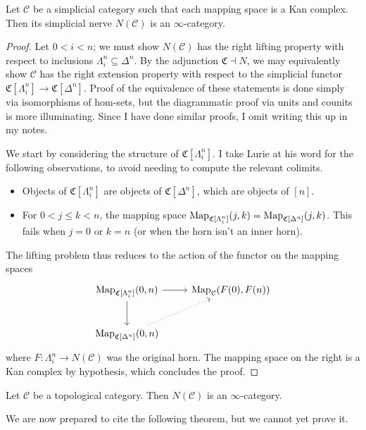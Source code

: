 \begin{proposition}\label{1.1.5.7}
	Let $\mathcal{C} $ be a simplicial category such that each mapping space is a Kan complex. Then its simplicial nerve $N(\mathcal{C} )$ is an $\infty $-category.
\end{proposition}
\begin{proof}
	Let $0<i<n$; we must show $N(\mathcal{C} )$ has the right lifting property with respect to inclusions $\Lambda _i^n\subseteq \Delta ^n$. By the adjunction $\mathfrak{C} \dashv N$, we may equivalently show $\mathcal{C} $ has the right extension property with respect to the simplicial functor $\mathfrak{C} [\Lambda _i^n]\to \mathfrak{C} [\Delta ^n]$. Proof of the equivalence of these statements is done simply via isomorphisms of hom-sets, but the diagrammatic proof via units and counits is more illuminating. Since I have done similar proofs, I omit writing this up in my notes.

	We start by considering the structure of $\mathfrak{C} [\Lambda _i^n]$. I take Lurie at his word for the following observations, to avoid needing to compute the relevant colimits.
	\begin{itemize}
		\item Objects of $\mathfrak{C} [\Lambda _i^n]$ are objects of $\mathfrak{C} [\Delta ^n]$, which are objects of $[n]$.
		\item For $0<j\leq k<n$, the mapping space $\operatorname{Map}_{\mathfrak{C} [\Lambda _i^n]} (j,k)=\operatorname{Map}_{\mathfrak{C} [\Delta ^n]} (j,k)$. This fails when $j=0$ or $k=n$ (or when the horn isn't an inner horn).
	\end{itemize}
	The lifting problem thus reduces to the action of the functor on the mapping spaces
	\[\begin{tikzcd}[row sep = 2.5em, column sep = 2.5em]
		\Map_{\mathfrak{C} [\Lambda _i^n]} (0,n)\ar[r] \ar[d]  & \Map_\mathcal{C} (F(0),F(n)) \\
		\Map_{\mathfrak{C} [\Delta ^n]} (0,n)\ar[dotted, ur]  & 
	\end{tikzcd}\]
	where $F : \Lambda _i^n \to N(\mathcal{C} )$ was the original horn. The mapping space on the right is a Kan complex by hypothesis, which concludes the proof.
\end{proof}
\begin{corollary}\label{1.1.5.8}
	Let $\mathcal{C} $ be a topological category. Then $N(\mathcal{C} )$ is an $\infty $-category.
\end{corollary}

We are now prepared to cite the following theorem, but we cannot yet prove it.

